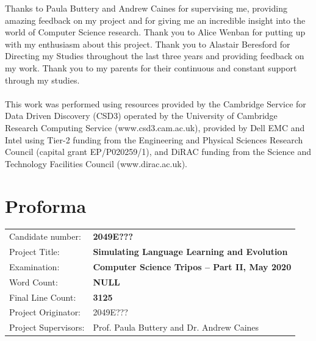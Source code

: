 \documentclass[12pt,a4paper]{report}
\begin{document}
Thanks to Paula Buttery and Andrew Caines for supervising me, providing amazing feedback on my project and for giving me an incredible insight into the world of Computer Science research. Thank you to Alice Wenban for putting up with my enthusiasm about this project. Thank you to Alastair Beresford for Directing my Studies throughout the last three years and providing feedback on my work. Thank you to my parents for their continuous and constant support through my studies.
\\
\\
This work was performed using resources provided by the Cambridge Service for Data Driven Discovery (CSD3) operated by the University of Cambridge Research Computing Service (www.csd3.cam.ac.uk), provided by Dell EMC and Intel using Tier-2 funding from the Engineering and Physical Sciences Research Council (capital grant EP/P020259/1), and DiRAC funding from the Science and Technology Facilities Council (www.dirac.ac.uk).

\chapter*{Proforma}

{\large
\begin{tabular}{ll}
Candidate number:               & \bf 2049E???                       \\
Project Title:      & \bf Simulating Language Learning and Evolution \\
Examination:        & \bf Computer Science Tripos -- Part II, May 2020  \\
Word Count:         & \bf NULL\footnotemark[1]  \\
Final Line Count:         & \bf 3125 \footnotemark[2]  \\
Project Originator: & 2049E???                    \\
Project Supervisors:         & Prof. Paula Buttery and Dr. Andrew Caines                  \\ 
\end{tabular}
}
\end{document}
